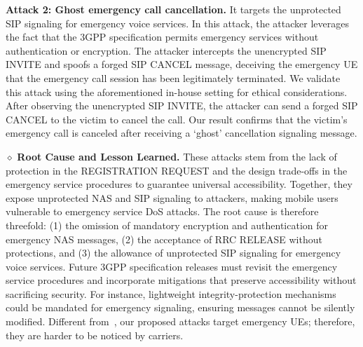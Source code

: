 \documentclass[sigconf]{acmart}
\begin{document}
{\noindent \textbf{Attack 2: Ghost emergency call cancellation.} 
It targets the unprotected SIP signaling for emergency voice services. In this attack, the attacker leverages the fact that the 3GPP specification permits emergency services without authentication or encryption. The attacker intercepts the unencrypted SIP INVITE and spoofs a forged SIP CANCEL message, deceiving the emergency UE that the emergency call session has been legitimately terminated. We validate this attack using the aforementioned in-house setting for ethical considerations. After observing the unencrypted SIP INVITE, the attacker can send a forged SIP CANCEL to the victim to cancel the call. Our result confirms that the victim's emergency call is canceled after receiving a `ghost' cancellation signaling message.   

\noindent $\diamond$ \textbf{Root Cause and Lesson Learned.} 
These attacks stem from the lack of protection in the REGISTRATION REQUEST and the design trade-offs in the emergency service procedures to guarantee universal accessibility. Together, they expose unprotected NAS and SIP signaling to attackers, making mobile users vulnerable to emergency service DoS attacks. 
The root cause is therefore threefold: (1) the omission of mandatory encryption and authentication for emergency NAS messages, (2) the acceptance of RRC RELEASE without protections, and (3) the allowance of unprotected SIP signaling for emergency voice services. Future 3GPP specification releases must revisit the emergency service procedures and incorporate mitigations that preserve accessibility without sacrificing security. For instance, lightweight integrity-protection mechanisms could be mandated for emergency signaling, ensuring messages cannot be silently modified. Different from~\cite{hu2022uncovering}, our proposed attacks target emergency UEs; therefore, they are harder to be noticed by carriers.



}
\end{document}
